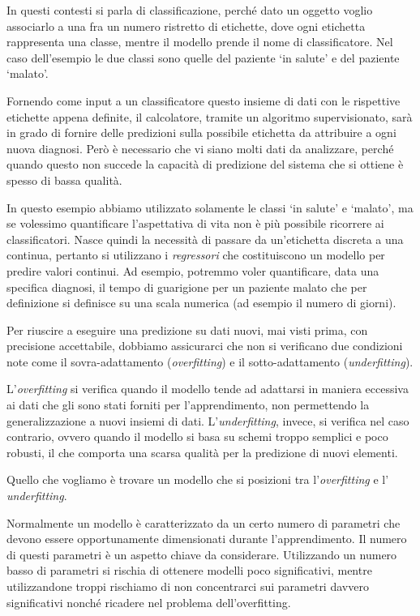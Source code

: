 \documentclass[a4paper,12pt]{report}
\begin{document}
In questi contesti si parla di classificazione, perché dato un oggetto voglio associarlo a una fra un numero ristretto di etichette, dove ogni etichetta rappresenta una classe, mentre il modello prende il nome di classificatore. Nel caso dell'esempio le due classi sono quelle del paziente `in salute' e del paziente `malato'. 

Fornendo come input a un classificatore questo insieme di dati con le rispettive etichette appena definite, il calcolatore, tramite un algoritmo supervisionato, sarà in grado di fornire delle predizioni sulla possibile etichetta da attribuire a ogni nuova diagnosi.
Però è necessario che vi siano molti dati da analizzare, perché quando questo non succede la capacità di predizione del sistema che si ottiene è spesso di bassa qualità.

In questo esempio abbiamo utilizzato solamente le classi `in salute' e `malato', ma se volessimo quantificare l'aspettativa di vita non è più possibile ricorrere ai classificatori. Nasce quindi la necessità di passare da un'etichetta discreta a una continua, pertanto si utilizzano i \textit{regressori} che costituiscono un modello per predire valori continui.
Ad esempio, potremmo voler quantificare, data una specifica diagnosi, il tempo di guarigione per un paziente malato che per definizione si definisce su una scala numerica (ad esempio il numero di giorni).

Per riuscire a eseguire una predizione su dati nuovi, mai visti prima, con precisione accettabile, dobbiamo assicurarci che non si verificano due condizioni note come il sovra-adattamento (\textit{overfitting}) e il sotto-adattamento (\textit{underfitting}).


L’\textit{overfitting} si verifica quando il modello tende ad adattarsi in maniera eccessiva ai dati che gli sono stati forniti per l'apprendimento, non permettendo la generalizzazione a nuovi insiemi di dati. L’\textit{underfitting}, invece, si verifica nel caso contrario, ovvero quando il modello si basa su schemi troppo semplici e poco robusti, il che comporta una scarsa qualità per la predizione di nuovi elementi.

Quello che vogliamo è trovare un modello che si posizioni tra l'\textit{overfitting} e l' \textit{underfitting}.

Normalmente un modello è caratterizzato da un certo numero di parametri che devono essere opportunamente dimensionati durante l'apprendimento.
Il numero di questi parametri è un aspetto chiave da considerare.
Utilizzando un numero basso di parametri si rischia di ottenere modelli poco significativi, mentre utilizzandone troppi rischiamo di non concentrarci sui parametri davvero significativi nonché ricadere nel problema dell'overfitting.
\end{document}
